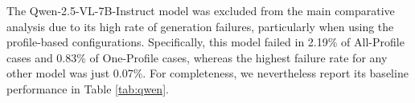 \begin{enumerate}
The Qwen-2.5-VL-7B-Instruct model was excluded from the main comparative analysis due to its high rate of generation failures, particularly when using the profile-based configurations. Specifically, this model failed in 2.19\% of All-Profile cases and 0.83\% of One-Profile cases, whereas the highest failure rate for any other model was just 0.07\%. For completeness, we nevertheless report its baseline performance in Table \autoref{tab:qwen}.

\end{enumerate}




